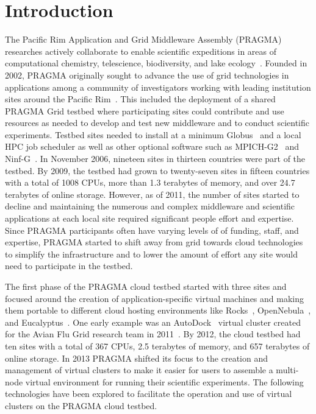 \documentclass{acm_proc_article-sp}
\begin{document}


\section{Introduction}

The Pacific Rim Application and Grid Middleware Assembly (PRAGMA) researches actively collaborate to enable scientific expeditions in areas of computational chemistry, telescience, biodiversity, and lake ecology~\cite{pragmaWeb}.  Founded in 2002, PRAGMA originally sought to advance the use of grid technologies in applications among a community of investigators working with leading institution sites around the Pacific Rim~\cite{pragmaReport2004}.  This included the deployment of a shared PRAGMA Grid testbed where participating sites could contribute and use resources as needed to develop and test new middleware and to conduct scientific experiments.  Testbed sites needed to install at a minimum Globus~\cite{globus} and a local HPC job scheduler as well as other optional software such as MPICH-G2~\cite{mpichg2} and Ninf-G~\cite{ninfg}.  In November 2006, nineteen sites in thirteen countries were part of the testbed.  By 2009, the testbed had grown to twenty-seven sites in fifteen countries with a total of 1008 CPUs, more than 1.3 terabytes of memory, and over 24.7 terabytes of online storage.  However, as of 2011, the number of sites started to decline and maintaining the numerous and complex middleware and scientific applications at each local site required significant people effort and expertise.  Since PRAGMA participants often have varying levels of of funding, staff, and expertise, PRAGMA started to shift away from grid towards cloud technologies to simplify the infrastructure and to lower the amount of effort any site would need to participate in the testbed.  

The first phase of the PRAGMA cloud testbed started with three sites and focused around the creation of application-specific virtual machines and making them portable to  different cloud hosting environments like Rocks~\cite{rocks}, OpenNebula~\cite{opennebula}, and Eucalyptus~\cite{eucalyptus}.
One early example was an AutoDock~\cite{autodock} virtual cluster created for the Avian Flu Grid research team in 2011~\cite{pragmaReport2011}.   By 2012, the cloud testbed had ten sites with a total of 367 CPUs, 2.5 terabytes of memory, and 657 terabytes of online storage.  In 2013 PRAGMA shifted its  focus to the creation and management of virtual clusters to make it easier for users to assemble a multi-node virtual environment for running their scientific experiments.  The following technologies have been explored to facilitate the operation and use of virtual clusters on the PRAGMA cloud testbed.
\end{document}
